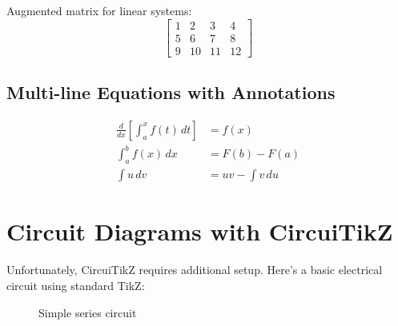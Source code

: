 \documentclass[11pt,a4paper]{article}
\theoremstyle{definition}
\begin{document}
Augmented matrix for linear systems:
\begin{equation}
    \left[\begin{array}{ccc|c}
        1 & 2 & 3 & 4 \\
        5 & 6 & 7 & 8 \\
        9 & 10 & 11 & 12
    \end{array}\right]
\end{equation}

\subsection{Multi-line Equations with Annotations}

\begin{align}
    \frac{d}{dx}\left[\int_a^x f(t)\,dt\right] &= f(x) \tag{Fundamental Theorem} \\
    \int_a^b f(x)\,dx &= F(b) - F(a) \tag{Evaluation} \\
    \int u\,dv &= uv - \int v\,du \tag{Integration by Parts}
\end{align}

\section{Circuit Diagrams with CircuiTikZ}

Unfortunately, CircuiTikZ requires additional setup. Here's a basic electrical circuit using standard TikZ:

\begin{figure}[H]
\centering
{}
\caption{Simple series circuit}
\label{fig:circuit}
\end{figure}
\end{document}
